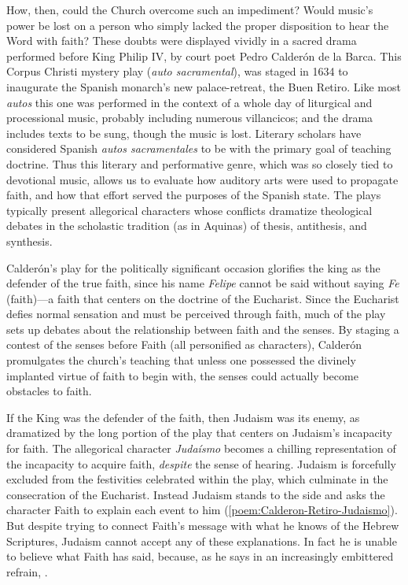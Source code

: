 How, then, could the Church overcome such an impediment?
Would music's power be lost on a person who simply lacked the proper disposition
to hear the Word with faith?
These doubts were displayed vividly in a sacred drama performed before King
Philip IV,  by court poet Pedro Calderón de
la Barca.%
    \Autocite{Calderon:Retiro}
This Corpus Christi mystery play (\emph{auto sacramental}), was staged in 1634
to inaugurate the Spanish monarch's new palace-retreat, the Buen Retiro.
Like most \emph{autos} this one was performed in the context of a whole day of
liturgical and processional music, probably including numerous villancicos; and
the drama includes texts to be sung, though the music is lost.
Literary scholars have considered Spanish \emph{autos sacramentales} to be
 with the primary goal of teaching
doctrine.
Thus this literary and performative genre, which was so closely tied to
devotional music, allows us to evaluate how auditory arts were used to propagate
faith, and how that effort served the purposes of the Spanish state.
The plays typically present allegorical characters whose conflicts dramatize
theological debates in the scholastic tradition (as in Aquinas) of thesis,
antithesis, and synthesis.

Calderón's play for the politically significant occasion glorifies the king as
the defender of the true faith, since his name \emph{Felipe} cannot be said
without saying \emph{Fe} (faith)---a faith that centers on the doctrine of the
Eucharist.%
    \Autocite[]{Calderon:Retiro}
Since the Eucharist defies normal sensation and must be perceived through faith,
much of the play sets up debates about the relationship between faith and the
senses.
By staging a contest of the senses before Faith (all personified as characters),
Calderón promulgates the church's teaching that unless one possessed the
divinely implanted virtue of faith to begin with, the senses could actually
become obstacles to faith.

If the King was the defender of the faith, then Judaism was its enemy, as
dramatized by the long portion of the play that centers on Judaism's incapacity
for faith.
The allegorical character \emph{Judaísmo} becomes a chilling representation of
the incapacity to acquire faith, \emph{despite} the sense of hearing.
Judaism is forcefully excluded from the festivities celebrated within the play,
which culminate in the consecration of the Eucharist.
Instead Judaism stands to the side and asks the character Faith to explain each
event to him (\cref{poem:Calderon-Retiro-Judaismo}).
But despite trying to connect Faith's message with what he knows of the Hebrew
Scriptures, Judaism cannot accept any of these explanations.
In fact he is unable to believe what Faith has said, because, as he says in an
increasingly embittered refrain, .

